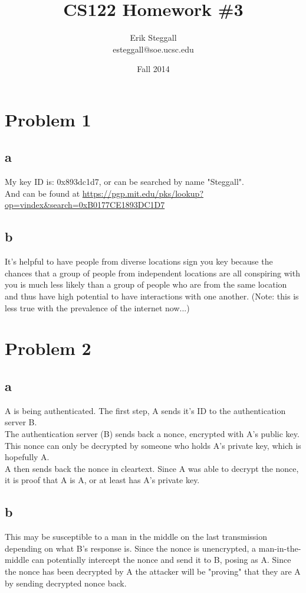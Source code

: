 \documentclass{article}
\title{CS122 Homework \#3}
\author{Erik Steggall\\esteggall@soe.ucsc.edu}
\date{Fall 2014}
\begin{document}
 \maketitle \pagestyle{empty}
\section*{Problem 1}
\subsection*{a}
My key ID is: 0x893dc1d7, or can be searched by name "Steggall".\\
And can be found at \url{https://pgp.mit.edu/pks/lookup?op=vindex&search=0xB0177CE1893DC1D7}\\
\subsection*{b}
It's helpful to have people from diverse locations sign you key because the chances that a group of people from independent locations are all conspiring with you is much less likely than a group of people who are from the same location and thus have high potential to have interactions with one another. (Note: this is less true with the prevalence of the internet now...)\\
\section*{Problem 2}
\subsection*{a}
A is being authenticated. The first step, A sends it's ID to the authentication server B.\\ 

The authentication server (B) sends back a nonce, encrypted with A's public key. This nonce can only be decrypted by someone who holds A's private key, which is hopefully A.\\

A then sends back the nonce in cleartext. Since A was able to decrypt the nonce, it is proof that A is A, or at least has A's private key.\\
\subsection*{b}
This may be susceptible to a man in the middle on the last transmission depending on what B's response is. Since the nonce is unencrypted, a man-in-the-middle can potentially intercept the nonce and send it to B, posing as A. Since the nonce has been decrypted by A the attacker will be "proving" that they are A by sending decrypted nonce back.\\
\end{document}
